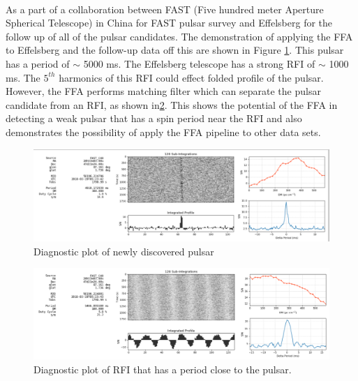 \documentclass[thesis_msc.tex]{subfiles}
\begin{document}
    \paragraph{} As a part of a collaboration between FAST (Five hundred meter Aperture Spherical Telescope) in China for FAST pulsar survey and Effelsberg for the follow up of all of the pulsar candidates. The demonstration of applying the FFA to Effelsberg and the follow-up data off this are shown in Figure \ref{Fast_pulsar}. This pulsar has a period of $\sim$ 5000 ms. The Effelsberg telescope has a strong RFI of $ \sim$ 1000 ms. The $5^{th}$ harmonics of this RFI could effect folded profile of the pulsar. However, the FFA performs matching filter which can separate the pulsar candidate from an RFI, as shown in\ref{fast_rfi}. This shows the potential of the FFA in detecting a weak pulsar that has a spin period near the RFI and also demonstrates the possibility of apply the FFA pipeline to other data sets.     
    
    \begin{figure}[h]
\centering
\includegraphics[width=1.0\textwidth]{figures/FAST_pulsar.png}
\caption{Diagnostic plot of newly discovered pulsar}\label{Fast_pulsar}
\end{figure}

    \begin{figure}[h]
\centering
\includegraphics[width=1.0\textwidth]{figures/RFI_fast.png}
\caption{Diagnostic plot of RFI that has a period close to the pulsar.}\label{fast_rfi}
\end{figure}
\end{document}
